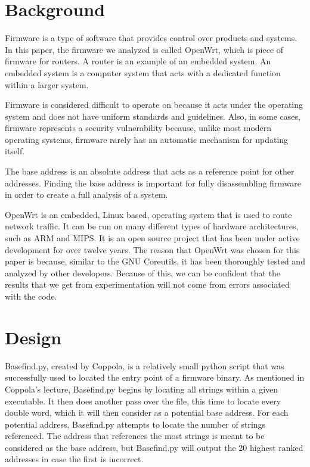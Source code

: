 \documentclass[letterpaper,twocolumn,10pt]{article}
\begin{document}
\section{Background}
Firmware is a type of software that provides control over products and systems. In this paper, the firmware we analyzed is called OpenWrt, which is piece of firmware for routers. A router is an example of an embedded system. An embedded system is a computer system that acts with a dedicated function within a larger system.               

Firmware is considered difficult to operate on because it acts under the operating system and does not have uniform standards and guidelines. Also, in some cases, firmware represents a security vulnerability because, unlike most modern operating systems, firmware rarely has an automatic mechanism for updating itself\cite{firmwaresecurity2014}. 

The base address is an absolute address that acts as a reference point for other addresses. Finding the base address is important for fully disassembling firmware in order to create a full analysis of a system. 

OpenWrt is an embedded, Linux based, operating system that is used to route network traffic. It can be run on many different types of hardware architectures, such as ARM and MIPS. It is an open source project that has been under active development for over twelve years. The reason that OpenWrt was chosen for this paper is because, similar to the GNU Coreutils, it has been thoroughly tested and analyzed by other developers. Because of this, we can be confident that the results that we get from experimentation will not come from errors associated with the code. 

\section{Design}
Basefind.py, created by Coppola\cite{cloudscale2013}, is a relatively small python script that was successfully used to located the entry point of a firmware binary. As mentioned in Coppola's lecture, Basefind.py begins by locating all strings within a given executable. It then does another pass over the file, this time to locate every double word, which it will then consider as a potential base address. For each potential address, Basefind.py attempts to locate the number of strings referenced. The address that references the most strings is meant to be considered as the base address, but Basefind.py will output the 20 highest ranked addresses in case the first is incorrect. 
\end{document}
